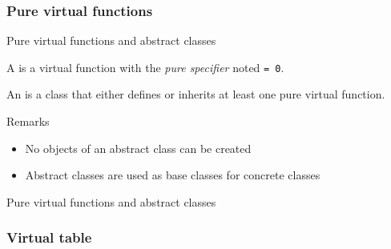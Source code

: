 \subsubsection{Pure virtual functions}

\begin{frame}{Pure virtual functions and abstract classes}{}
  \begin{definition}
    A  is a virtual function with the \emph{pure specifier} noted \lstinline!= 0!.
  \end{definition}

  \begin{definition}
    An  is a class that either defines or inherits at least one pure virtual function.
  \end{definition}

  \begin{block}{Remarks}
    \begin{itemize}
    \item
      No objects of an abstract class can be created
    \item
      Abstract classes are used as base classes for concrete classes
    \end{itemize}
  \end{block}
\end{frame}

\begin{frame}{Pure virtual functions and abstract classes}{}
  \begin{example}
  \end{example}
\end{frame}

\subsubsection{Virtual table}

